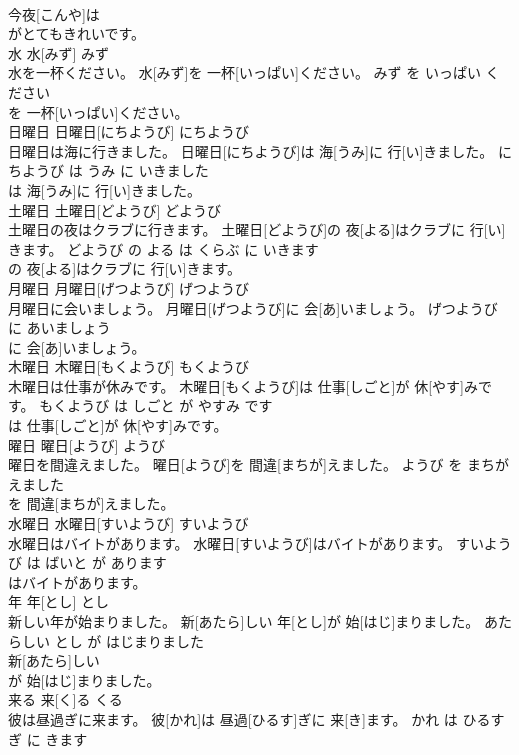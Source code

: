 \documentclass[8pt]{extreport}
\begin{document}
\begin{CJK}{UTF8}{min}
\\	今夜[こんや]は
\\	がとてもきれいです。			
\\	水	水[みず]	みず	
\\	水を一杯ください。	水[みず]を 一杯[いっぱい]ください。	みず を いっぱい ください	
\\	を 一杯[いっぱい]ください。			
\\	日曜日	日曜日[にちようび]	にちようび	
\\	日曜日は海に行きました。	日曜日[にちようび]は 海[うみ]に 行[い]きました。	にちようび は うみ に いきました	
\\	は 海[うみ]に 行[い]きました。			
\\	土曜日	土曜日[どようび]	どようび	
\\	土曜日の夜はクラブに行きます。	土曜日[どようび]の 夜[よる]はクラブに 行[い]きます。	どようび の よる は くらぶ に いきます	
\\	の 夜[よる]はクラブに 行[い]きます。			
\\	月曜日	月曜日[げつようび]	げつようび	
\\	月曜日に会いましょう。	月曜日[げつようび]に 会[あ]いましょう。	げつようび に あいましょう	
\\	に 会[あ]いましょう。			
\\	木曜日	木曜日[もくようび]	もくようび	
\\	木曜日は仕事が休みです。	木曜日[もくようび]は 仕事[しごと]が 休[やす]みです。	もくようび は しごと が やすみ です	
\\	は 仕事[しごと]が 休[やす]みです。			
\\	曜日	曜日[ようび]	ようび	
\\	曜日を間違えました。	曜日[ようび]を 間違[まちが]えました。	ようび を まちがえました	
\\	を 間違[まちが]えました。			
\\	水曜日	水曜日[すいようび]	すいようび	
\\	水曜日はバイトがあります。	水曜日[すいようび]はバイトがあります。	すいようび は ばいと が あります	
\\	はバイトがあります。			
\\	年	年[とし]	とし	
\\	新しい年が始まりました。	新[あたら]しい 年[とし]が 始[はじ]まりました。	あたらしい とし が はじまりました	
\\	新[あたら]しい
\\	が 始[はじ]まりました。			
\\	来る	来[く]る	くる	
\\	彼は昼過ぎに来ます。	彼[かれ]は 昼過[ひるす]ぎに 来[き]ます。	かれ は ひるすぎ に きます	

\end{CJK}
\end{document}
